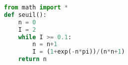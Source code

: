 \begin{lstlisting}[language=python]
from math import *
def seuil():
	n = 0
	I = 2
	while I >= 0.1:
		n = n+1
		I = (1+exp(-n*pi))/(n*n+1)
	return n
\end{lstlisting}